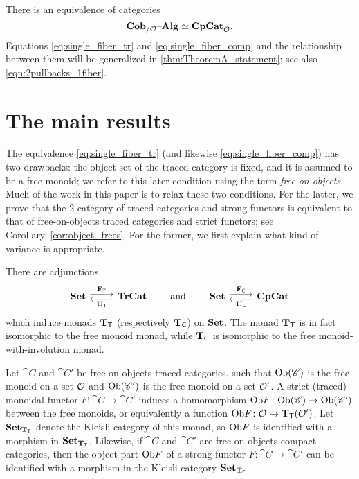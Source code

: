\documentclass[11pt,oneside,article]{memoir}
\begin{document}
There is an equivalence of categories
\begin{equation}\label{eq:single_fiber_comp}
   \mathbf{Cob}_{/\mathcal{O}}{\text \textendash}\mathbf{Alg}\simeq\mathbf{CpCat}_{\mathcal{O}}.
\end{equation}
Equations \eqref{eq:single_fiber_tr} and \eqref{eq:single_fiber_comp} and the relationship between them will be generalized in \ref{thm:TheoremA_statement}; see also \eqref{eqn:2pullbacks_1fiber}.

\section{The main results}\label{subsec:main_results}

The equivalence \eqref{eq:single_fiber_tr} (and likewise \eqref{eq:single_fiber_comp}) has two
drawbacks: the object set of the traced category is fixed, and it is assumed to be a free monoid; we
refer to this later condition using the term \emph{free-on-objects}. Much of the work in this paper is
to relax these two conditions. For the latter, we prove that the 2-category of traced categories and strong functors is
equivalent to that of free-on-objects traced categories and strict functors; see Corollary~\ref{cor:object_frees}. For
the former, we first explain what kind of variance is appropriate.

There are adjunctions
\begin{equation*}
   \Adjoint{\Set}{\TrCat}{\FT}{\UT}
   \qquad\text{and}\qquad
   \Adjoint{\Set}{\CompCat}{\FC}{\UC}
\end{equation*}
which induce monads $\mathbf{T}_{\mathsf{T}}$ (respectively $\mathbf{T}_{\mathsf{C}}$) on $\mathbf{Set}$. The monad $\mathbf{T}_{\mathsf{T}}$ is in fact isomorphic to
the free monoid monad, while $\mathbf{T}_{\mathsf{C}}$ is isomorphic to the free monoid-with-involution monad.

Let $\cat{C}$ and $\cat{C}'$ be free-on-objects traced categories, such that $\mathrm{Ob}(\mathscr{C})$ is the free
monoid on a set $\mathcal{O}$ and $\mathrm{Ob}(\mathscr{C}')$ is the free monoid on a set $\mathcal{O}'$. A strict
(traced) monoidal functor $F\colon \cat{C}\to \cat{C}'$ induces a homomorphism
$\mathrm{Ob} F\colon\mathrm{Ob}(\mathscr{C})\to\mathrm{Ob}(\mathscr{C}')$ between the free monoids, or equivalently a function $\mathrm{Ob}
F\colon\mathcal{O}\to\mathbf{T}_{\mathsf{T}}(\mathcal{O}')$. Let $\mathbf{Set}_{\mathbf{T}_{\mathsf{T}}}$ denote the Kleisli category of this monad, so $\mathrm{Ob}
F$ is identified with a morphism in $\mathbf{Set}_{\mathbf{T}_{\mathsf{T}}}$. Likewise, if $\cat{C}$ and $\cat{C}'$ are
free-on-objects compact categories, then the object part $\mathrm{Ob} F$ of a strong functor
$F\colon\cat{C}\to\cat{C}'$ can be identified with a morphism in the Kleisli category $\mathbf{Set}_{\mathbf{T}_{\mathsf{C}}}$.
\end{document}
